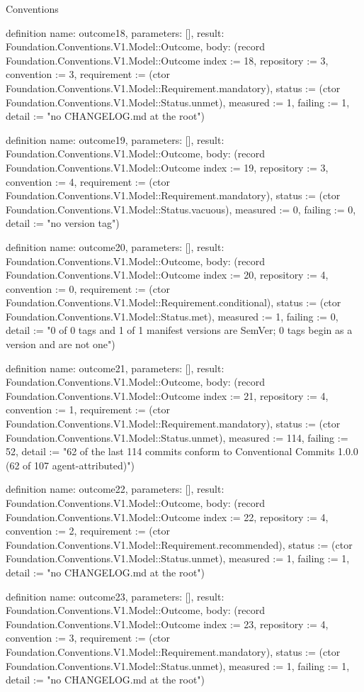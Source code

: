 \begin{lexlean}{Conventions}
\begin{semanticmodule}
definition{
  name: outcome18,
  parameters: [],
  result: Foundation.Conventions.V1.Model::Outcome,
  body: (record Foundation.Conventions.V1.Model::Outcome {index := 18, repository := 3, convention := 3, requirement := (ctor Foundation.Conventions.V1.Model::Requirement.mandatory), status := (ctor Foundation.Conventions.V1.Model::Status.unmet), measured := 1, failing := 1, detail := "no CHANGELOG.md at the root"})
}

definition{
  name: outcome19,
  parameters: [],
  result: Foundation.Conventions.V1.Model::Outcome,
  body: (record Foundation.Conventions.V1.Model::Outcome {index := 19, repository := 3, convention := 4, requirement := (ctor Foundation.Conventions.V1.Model::Requirement.mandatory), status := (ctor Foundation.Conventions.V1.Model::Status.vacuous), measured := 0, failing := 0, detail := "no version tag"})
}

definition{
  name: outcome20,
  parameters: [],
  result: Foundation.Conventions.V1.Model::Outcome,
  body: (record Foundation.Conventions.V1.Model::Outcome {index := 20, repository := 4, convention := 0, requirement := (ctor Foundation.Conventions.V1.Model::Requirement.conditional), status := (ctor Foundation.Conventions.V1.Model::Status.met), measured := 1, failing := 0, detail := "0 of 0 tags and 1 of 1 manifest versions are SemVer; 0 tags begin as a version and are not one"})
}

definition{
  name: outcome21,
  parameters: [],
  result: Foundation.Conventions.V1.Model::Outcome,
  body: (record Foundation.Conventions.V1.Model::Outcome {index := 21, repository := 4, convention := 1, requirement := (ctor Foundation.Conventions.V1.Model::Requirement.mandatory), status := (ctor Foundation.Conventions.V1.Model::Status.unmet), measured := 114, failing := 52, detail := "62 of the last 114 commits conform to Conventional Commits 1.0.0 (62 of 107 agent-attributed)"})
}

definition{
  name: outcome22,
  parameters: [],
  result: Foundation.Conventions.V1.Model::Outcome,
  body: (record Foundation.Conventions.V1.Model::Outcome {index := 22, repository := 4, convention := 2, requirement := (ctor Foundation.Conventions.V1.Model::Requirement.recommended), status := (ctor Foundation.Conventions.V1.Model::Status.unmet), measured := 1, failing := 1, detail := "no CHANGELOG.md at the root"})
}

definition{
  name: outcome23,
  parameters: [],
  result: Foundation.Conventions.V1.Model::Outcome,
  body: (record Foundation.Conventions.V1.Model::Outcome {index := 23, repository := 4, convention := 3, requirement := (ctor Foundation.Conventions.V1.Model::Requirement.mandatory), status := (ctor Foundation.Conventions.V1.Model::Status.unmet), measured := 1, failing := 1, detail := "no CHANGELOG.md at the root"})
}


\end{semanticmodule}
\end{lexlean}
